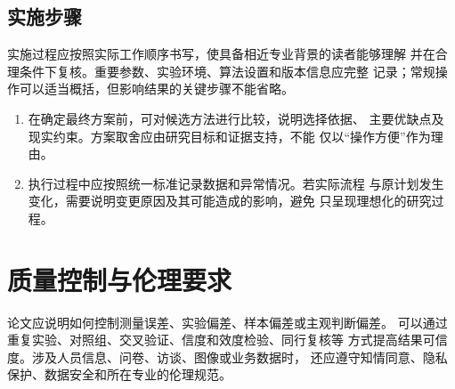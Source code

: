 \subsection{实施步骤}

实施过程应按照实际工作顺序书写，使具备相近专业背景的读者能够理解
并在合理条件下复核。重要参数、实验环境、算法设置和版本信息应完整
记录；常规操作可以适当概括，但影响结果的关键步骤不能省略。

\begin{enumerate}
  \item 在确定最终方案前，可对候选方法进行比较，说明选择依据、
    主要优缺点及现实约束。方案取舍应由研究目标和证据支持，不能
    仅以“操作方便”作为理由。
  \item 执行过程中应按照统一标准记录数据和异常情况。若实际流程
    与原计划发生变化，需要说明变更原因及其可能造成的影响，避免
    只呈现理想化的研究过程。
\end{enumerate}

\section{质量控制与伦理要求}

论文应说明如何控制测量误差、实验偏差、样本偏差或主观判断偏差。
可以通过重复实验、对照组、交叉验证、信度和效度检验、同行复核等
方式提高结果可信度。涉及人员信息、问卷、访谈、图像或业务数据时，
还应遵守知情同意、隐私保护、数据安全和所在专业的伦理规范。

